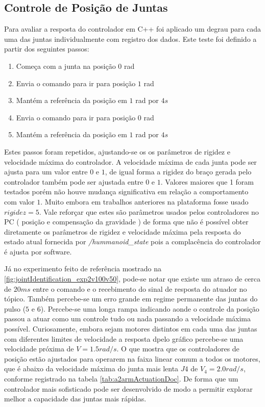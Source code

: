 \subsection{Controle de Posição de Juntas}\label{subsec:stepcpp}

Para avaliar a resposta do controlador em C++ foi aplicado um degrau para cada uma das juntas individualmente com registro dos dados. Este teste foi definido a partir dos seguintes passos:

\begin{enumerate}
    \item Começa com a junta na posição $0$ rad
    \item Envia o comando para ir para posição $1$ rad
    \item Mantém a referência da posição em $1$ rad por $4s$
    \item Envia o comando para ir para posição $0$ rad
    \item Mantém a referência da posição em $1$ rad por $4s$
\end{enumerate}

Estes passos foram repetidos, ajustando-se os os parâmetros de rigidez e velocidade máxima do controlador. A velocidade máxima de cada junta pode ser ajusta para um valor entre $0$ e $1$, de igual forma a rigidez do braço gerada pelo controlador também pode ser ajustada entre $0$ e $1$. Valores maiores que 1 foram testados porém não houve mudança significativa em relação a comportamento com valor $1$. Muito embora em trabalhos anteriores na plataforma fosse usado $rigidez = 5$. Vale reforçar que estes são parâmetros usados pelos controladores no PC ( posição e compensação da gravidade ) de forma que não é possível obter diretamente os parâmetros de rigidez e velocidade máxima pela resposta do estado atual fornecida por \textit{/hummanoid\_state} pois a complacência do controlador é ajusta por software.

Já no experimento feito de referência mostrado na \ref{fig:jointIdentification_exp2v100v50}, pode-se notar que existe um atraso de cerca de $20ms$ entre o comando e o recebimento do sinal de resposta do atuador no tópico. Também percebe-se um erro grande em regime permanente das juntas do pulso ($5$ e $6$). Percebe-se uma longa rampa indicando aonde o controle da posição passou a atuar como um controle tudo ou nada passando a velocidade máxima possível. Curiosamente, embora sejam motores distintos em cada uma das juntas com diferentes limites de velocidade a resposta dpelo gráfico percebe-se uma velocidade próxima de $V = 1.5 rad/s$. O que mostra que os controladores de posição estão ajustados para operarem na faixa linear comum a todos os motores, que é abaixo da velocidade máxima do junta mais lenta $J4$ de $V_4 = 2.0 rad/s$, conforme registrado na tabela \ref{tab:a2armActuationDoc}. De forma que um controlador mais sofisticado pode ser desenvolvido de modo a permitir explorar melhor a capacidade das juntas mais rápidas.

